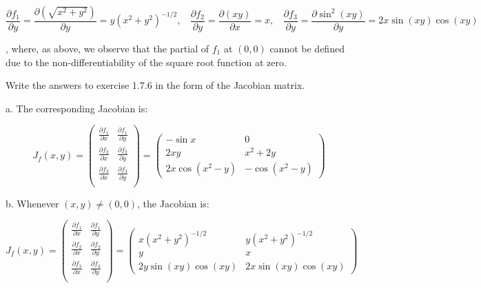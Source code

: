 \begin{solution}
    $$\frac{\partial f_1}{\partial y} = \frac{\partial (\sqrt{x^2 + y^2})}{\partial y} = y(x^2 +y^2)^{-1/2},\ \ \ \ \frac{\partial f_2}{\partial y} = \frac{\partial (xy)}{\partial x} = x,\ \ \ \ \frac{\partial f_3}{\partial y} = \frac{\partial \sin^2 (xy)}{\partial y} = 2x\sin (xy) \cos(xy)$$

    , where, as above, we observe that the partial of $f_1$ at $(0, 0)$ cannot be defined due to the non-differentiability of the square root function at zero.
    
\end{solution}

\begin{exercise}{7}
    Write the answers to exercise 1.7.6 in the form of the Jacobian matrix.
\end{exercise}

\begin{solution}

    a. The corresponding Jacobian is:

    $$J_f (x, y) = \begin{pmatrix}
        \frac{\partial f_1}{\partial x} & \frac{\partial f_1}{\partial y} \\
        \frac{\partial f_2}{\partial x} & \frac{\partial f_2}{\partial y} \\        
        \frac{\partial f_3}{\partial x} & \frac{\partial f_3}{\partial y} \\
    \end{pmatrix} =  \begin{pmatrix}
        -\sin x & 0 \\ 2xy & x^2+2y \\ 2x\cos(x^2-y) & -\cos(x^2 -y)
    \end{pmatrix}$$

    b. Whenever $(x, y) \neq (0, 0)$, the Jacobian is:

    $$J_f (x, y) = \begin{pmatrix}
        \frac{\partial f_1}{\partial x} & \frac{\partial f_1}{\partial y} \\
        \frac{\partial f_2}{\partial x} & \frac{\partial f_2}{\partial y} \\        
        \frac{\partial f_3}{\partial x} & \frac{\partial f_3}{\partial y} \\
    \end{pmatrix} =  \begin{pmatrix}
        x(x^2+y^2)^{-1/2} & y(x^2+y^2)^{-1/2} \\ y & x \\ 2y\sin(xy)\cos(xy) & 2x\sin(xy)\cos(xy)
    \end{pmatrix}$$    
\end{solution}

